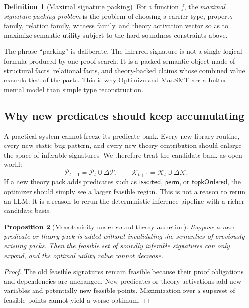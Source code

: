 \documentclass[11pt]{article}
\theoremstyle{definition}
\newtheorem{definition}{Definition}[section]
\theoremstyle{plain}
\newtheorem{proposition}[definition]{Proposition}
\begin{document}
\begin{definition}[Maximal signature packing]
For a function $f$, the \emph{maximal signature packing problem} is the problem
of choosing a carrier type, property family, relation family, witness family,
and theory activation vector so as to maximize semantic utility subject to the
hard soundness constraints above.
\end{definition}

The phrase ``packing'' is deliberate. The inferred signature is not a single
logical formula produced by one proof search. It is a packed semantic object made
of structural facts, relational facts, and theory-backed claims whose combined
value exceeds that of the parts. This is why Optimize and MaxSMT are a better
mental model than simple type reconstruction.

\subsection{Why new predicates should keep accumulating}
A practical system cannot freeze its predicate bank. Every new library routine,
every new static bug pattern, and every new theory contribution should enlarge
the space of inferable signatures. We therefore treat the candidate bank as
open-world:
\[
\mathcal{P}_{t+1} = \mathcal{P}_t \cup \Delta\mathcal{P},
\qquad
\mathcal{K}_{t+1} = \mathcal{K}_t \cup \Delta\mathcal{K}.
\]
If a new theory pack adds predicates such as \(\mathsf{issorted}\),
\(\mathsf{perm}\), or \(\mathsf{topkOrdered}\), the optimizer should simply see a
larger feasible region. This is not a reason to rerun an LLM. It is a reason to
rerun the deterministic inference pipeline with a richer candidate basis.

\begin{proposition}[Monotonicity under sound theory accretion]
Suppose a new predicate or theory pack is added without invalidating the
semantics of previously existing packs. Then the feasible set of soundly
inferable signatures can only expand, and the optimal utility value cannot
decrease.
\end{proposition}

\begin{proof}
The old feasible signatures remain feasible because their proof obligations and
dependencies are unchanged. New predicates or theory activations add new
variables and potentially new feasible points. Maximization over a superset of
feasible points cannot yield a worse optimum.
\end{proof}
\end{document}
